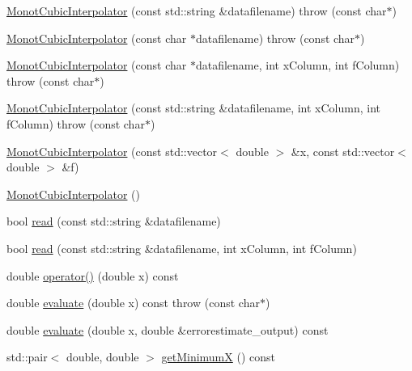 \begin{DoxyCompactItemize}
\item 
\hyperlink{class_opm_1_1_monot_cubic_interpolator_a867a219e8593ecfa5bb274b4fe194822}{Monot\+Cubic\+Interpolator} (const std\+::string \&datafilename)  throw (const char$\ast$)
\item 
\hyperlink{class_opm_1_1_monot_cubic_interpolator_aa68657c5ef757b3b0e60757d8821bc35}{Monot\+Cubic\+Interpolator} (const char $\ast$datafilename)  throw (const char$\ast$)
\item 
\hyperlink{class_opm_1_1_monot_cubic_interpolator_a8dcc3dfc593124de2b4c8314252c2d5b}{Monot\+Cubic\+Interpolator} (const char $\ast$datafilename, int x\+Column, int f\+Column)  throw (const char$\ast$)
\item 
\hyperlink{class_opm_1_1_monot_cubic_interpolator_aeefb12231546d10c188f2bd22c65b4c4}{Monot\+Cubic\+Interpolator} (const std\+::string \&datafilename, int x\+Column, int f\+Column)  throw (const char$\ast$)
\item 
\hyperlink{class_opm_1_1_monot_cubic_interpolator_ad332b4fc09fe97bc78db0e118dcb54ce}{Monot\+Cubic\+Interpolator} (const std\+::vector$<$ double $>$ \&x, const std\+::vector$<$ double $>$ \&f)
\item 
\hyperlink{class_opm_1_1_monot_cubic_interpolator_aa4447da095a37573f1daf2e2f0cf19ed}{Monot\+Cubic\+Interpolator} ()
\item 
bool \hyperlink{class_opm_1_1_monot_cubic_interpolator_a16c8f0f27938d06bbcc8ea0ffa82a07d}{read} (const std\+::string \&datafilename)
\item 
bool \hyperlink{class_opm_1_1_monot_cubic_interpolator_ad5468e1ee8f963c91ad5bf22d63eacc7}{read} (const std\+::string \&datafilename, int x\+Column, int f\+Column)
\item 
double \hyperlink{class_opm_1_1_monot_cubic_interpolator_ad131f46d15412e6cfe7d0972129012e2}{operator()} (double x) const 
\item 
double \hyperlink{class_opm_1_1_monot_cubic_interpolator_a64a19de4f6494e2979ddafdad4ba7aa3}{evaluate} (double x) const   throw (const char$\ast$)
\item 
double \hyperlink{class_opm_1_1_monot_cubic_interpolator_a730f97422b4384e3e59555560a7336af}{evaluate} (double x, double \&errorestimate\+\_\+output) const 
\item 
std\+::pair$<$ double, double $>$ \hyperlink{class_opm_1_1_monot_cubic_interpolator_a6c1755584ecc64ccb8dd5cb2d002c806}{get\+Minimum\+X} () const 
\item 

\end{DoxyCompactItemize}
